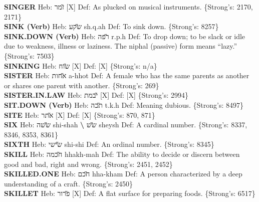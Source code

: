 {\textbf{SINGER} Heb: {\large\H זמר} {[}X{]} Def: As plucked on musical instruments. \{Strong's: 2170, 2171\}\hfill{}\\

\textbf{SINK (Verb)} Heb: {\large\H שקע} sh.q.ah Def: To sink down. \{Strong's: 8257\}\hfill{}\\

\textbf{SINK.DOWN (Verb)} Heb: {\large\H רפה} r.p.h Def: To drop down; to be slack or idle due to weakness, illness or laziness. The niphal (passive) form means ``lazy.'' \{Strong's: 7503\}\hfill{}\\

\textbf{SINKING} Heb: {\large\H שוח} {[}X{]} Def: {[}X{]} \{Strong's: n/a\}\hfill{}\\

\textbf{SISTER} Heb: {\large\H אחות} a-hhot Def: A female who has the same parents as another or shares one parent with another. \{Strong's: 269\}\hfill{}\\

\textbf{SISTER.IN.LAW} Heb: {\large\H יבמת} {[}X{]} Def: {[}X{]} \{Strong's: 2994\}\hfill{}\\

\textbf{SIT.DOWN (Verb)} Heb: {\large\H תכה} t.k.h Def: Meaning dubious. \{Strong's: 8497\}\hfill{}\\

\textbf{SITE} Heb: {\large\H אתר} {[}X{]} Def: {[}X{]} \{Strong's: 870, 871\}\hfill{}\\

\textbf{SIX} Heb: {\large\H ששה} shi-shah \textbf{\textbackslash{}} {\large\H שש} sheysh Def: A cardinal number. \{Strong's: 8337, 8346, 8353, 8361\}\hfill{}\\

\textbf{SIXTH} Heb: {\large\H שישי} shi-shi Def: An ordinal number. \{Strong's: 8345\}\hfill{}\\

\textbf{SKILL} Heb: {\large\H חכמה} hhakh-mah Def: The ability to decide or discern between good and bad, right and wrong. \{Strong's: 2451, 2452\}\hfill{}\\

\textbf{SKILLED.ONE} Heb: {\large\H חכם} hha-kham Def: A person characterized by a deep understanding of a craft. \{Strong's: 2450\}\hfill{}\\

\textbf{SKILLET} Heb: {\large\H פרור} {[}X{]} Def: A flat surface for preparing foods. \{Strong's: 6517\}\hfill{}\\

}
